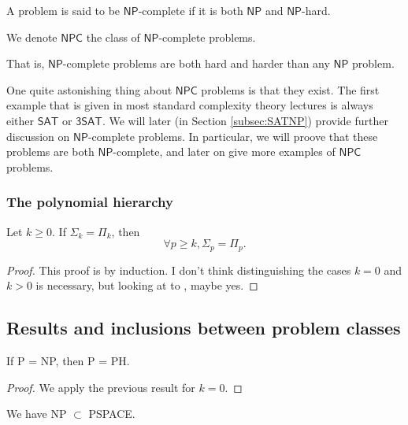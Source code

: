 \begin{definition}
    A problem is said to be $ \mathsf{NP} $-complete if it is both $ \mathsf{NP} $ and $ \mathsf{NP} $-hard.

    We denote $ \mathsf{NPC} $ the class of $ \mathsf{NP} $-complete problems.
\end{definition}

That is, $ \mathsf{NP} $-complete problems are both hard and harder than any $ \mathsf{NP} $ problem. 

One quite astonishing thing about $ \mathsf{NPC} $ problems is that they exist. The first example that is given in most standard complexity theory lectures is always either $ \mathsf{SAT} $ or $ \mathsf{3SAT} $. We will later (in Section \ref{subsec:SATNP}) provide further discussion on $ \mathsf{NP} $-complete problems. In particular, we will proove that these problems are both $ \mathsf{NP} $-complete, and later on give more examples of $ \mathsf{NPC} $ problems.

\subsubsection{The polynomial hierarchy}

\begin{proposition}
    Let $ k \ge 0 $.
    If $ \Sigma_k = \Pi_k $, then
    \[
        \forall p \ge k, \Sigma_p = \Pi_p.
    \]
\end{proposition}

\begin{proof}
    This proof is by induction. I don't think distinguishing the cases $ k = 0 $ and $ k > 0 $ is necessary, but looking at to \cite{gowers2024}, maybe yes.
\end{proof}

\subsection{Results and inclusions between problem classes}

\begin{corollary}
    If P = NP, then P = PH.
\end{corollary}

\begin{proof}
    We apply the previous result for $ k = 0 $.
\end{proof}

\begin{proposition}
    We have NP $ \subset $ PSPACE.
\end{proposition}

